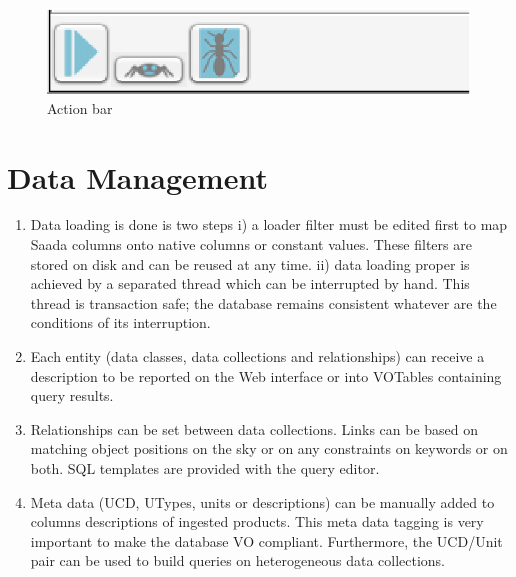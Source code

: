 \begin{figure}[!ht]
	\begin{center}
		\includegraphics[height=0.10\textwidth]{part8/MICHEL_P18/P18_fig3.eps}
	\end{center}
	\caption{Action bar}
	\label{fig:fig3 (fig. 4)}
\end{figure}

\section{Data Management}
\begin{enumerate}
\item Data loading is done is two steps i) a loader filter must be edited first to map Saada columns onto native columns or constant values. These filters are stored on disk and can be reused at any time. ii) data loading proper is achieved by a separated thread which can be interrupted by hand. This thread is transaction safe; the database remains consistent whatever are the conditions of its interruption.
\item Each entity (data classes, data collections and relationships) can receive a description to be reported on the Web interface or into VOTables containing query results.
\item Relationships can be set between data collections. Links can be based on matching object positions on the sky or on any constraints on keywords or on both. SQL templates are provided with the query editor.
\item Meta data (UCD, UTypes, units or descriptions) can be manually added to columns descriptions of ingested products. This meta data tagging is very important to make the database VO compliant. Furthermore, the UCD/Unit pair can be used to build queries on heterogeneous data collections.
\end{enumerate}

